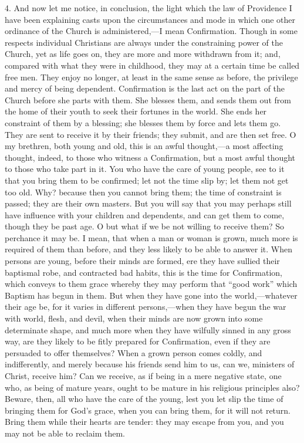 4. And now let me notice, in conclusion, the light which the law of
Providence I have been explaining casts upon the circumstances and
mode in which one other ordinance of the Church is administered,—I
mean Confirmation. Though in some respects individual Christians are
always under the constraining power of the Church, yet as life goes
on, they are more and more withdrawn from it; and, compared with what
they were in childhood, they may at a certain time be called free men.
They enjoy no longer, at least in the same sense as before, the
privilege and mercy of being dependent. Confirmation is the last act
on the part of the Church before she parts with them. She blesses
them, and sends them out from the home of their youth to seek their
fortunes in the world. She ends her constraint of them by a blessing;
she blesses them by force and lets them go. They are sent to receive
it by their friends; they submit, and are then set free. O my
brethren, both young and old, this is an awful thought,—a most
affecting thought, indeed, to those who witness a Confirmation, but a
most awful thought to those who take part in it. You who have the care
of young people, see to it that you bring them to be confirmed; let
not the time slip by; let them not get too old. Why? because then you
cannot bring them; the time of constraint is passed; they are their
own masters. But you will say that you may perhaps still have
influence with your children and dependents, and can get them to come,
though they be past age. O but what if we be not willing to receive
them? So perchance it may be. I mean, that when a man or woman is
grown, much more is required of them than before, and they less likely
to be able to answer it. When persons are young, before their minds
are formed, ere they have sullied their baptismal robe, and contracted
bad habits, this is the time for Confirmation, which conveys to them
grace whereby they may perform that ``good work'' which
Baptism has begun in them. But when they have gone into the world,—whatever
their age be, for it varies in different persons,—when they have
begun the war with world, flesh, and devil, when their minds are now
grown into some determinate shape, and much more when they have
wilfully sinned in any gross way, are they likely to be fitly prepared
for Confirmation, even if they are persuaded to offer themselves? When
a grown person comes coldly, and indifferently, and merely because his
friends send him to us, can we, ministers of Christ, receive him? Can
we receive, as if being in a mere negative state, one who, as being of
mature years, ought to be mature in his religious principles also?
Beware, then, all who have the care of the young, lest you let slip
the time of bringing them for God's grace, when you can bring them,
for it will not return. Bring them while their hearts are tender: they
may escape from you, and you may not be able to reclaim them.

